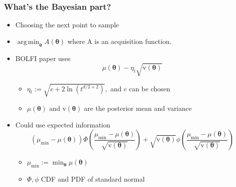 \documentclass{beamer}
\DeclareMathOperator*{\argmin}{arg\,min}
\begin{document}
\begin{frame}
    \frametitle{What's the Bayesian part?}
    \begin{itemize}
        \item Choosing the next point to sample
        \item <2->$\argmin_{\bm{\theta}}A(\bm\theta)$ where A is an acquisition function.
        \item <3-> BOLFI paper uses $$\mu(\bm\theta) - \eta_t\sqrt{\mathrm{v}(\bm\theta)}$$ \begin{itemize}
                  \item $\eta_t:= \sqrt{c + 2\ln(t^{d/2 + 2})},$ and $c$ can be chosen
                  \item $\mu(\bm\theta)$ and $\mathrm{v}(\bm\theta)$ are the posterior mean and variance
              \end{itemize}
        \item <4-> Could use expected information $$(\mu_\text{min} - \mu(\bm\theta))
                  \varPhi\left(\frac{\mu_\text{min} - \mu(\bm\theta)}{\sqrt{\mathrm{v}(\bm\theta)}}\right) + \sqrt{\mathrm{v}(\bm\theta)}
                  \phi\left(\frac{\mu_\text{min} - \mu(\bm\theta)}{\sqrt{\mathrm{v}(\bm\theta)}}\right)$$\begin{itemize}
                  \item $\mu_\text{min} := \min_{\bm{\theta}} \mu(\bm\theta)$
                  \item $\varPhi, \phi$ CDF and PDF of standard normal
              \end{itemize}
    \end{itemize}
\end{frame}
\end{document}
